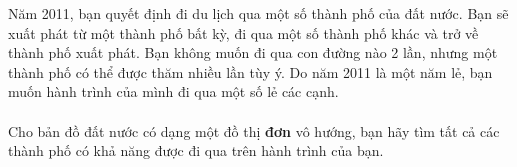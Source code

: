 Năm 2011, bạn quyết định đi du lịch qua một số thành phố của đất nước. Bạn sẽ xuất phát từ một thành phố bất kỳ, đi qua một số thành phố khác và trở về thành phố xuất phát. Bạn không muốn đi qua con đường nào 2 lần, nhưng một thành phố có thể được thăm nhiều lần tùy ý. Do năm 2011 là một năm lẻ, bạn muốn hành trình của mình đi qua một số lẻ các cạnh.   
\\
\\   Cho bản đồ đất nước có dạng một đồ thị   \textbf{    đơn   }   vô hướng, bạn hãy tìm tất cả các thành phố có khả năng được đi qua trên hành trình của bạn.